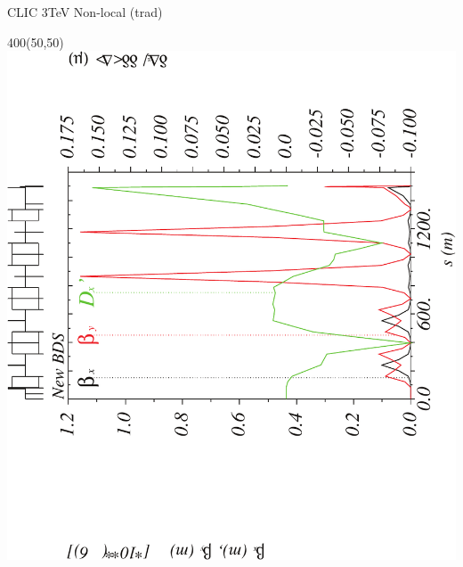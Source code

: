 \documentclass{beamer}
\begin{document}
\begin{frame}{CLIC 3TeV Non-local (trad)}
  \setlength{\TPHorizModule}{1pt}
  \setlength{\TPVertModule}{1pt}
 \begin{textblock}{400}(50,50)
 \includegraphics[scale=0.4,angle=-90]{CLICtrad_ddx-crop.pdf}
 \end{textblock}
\end{frame}
\end{document}
